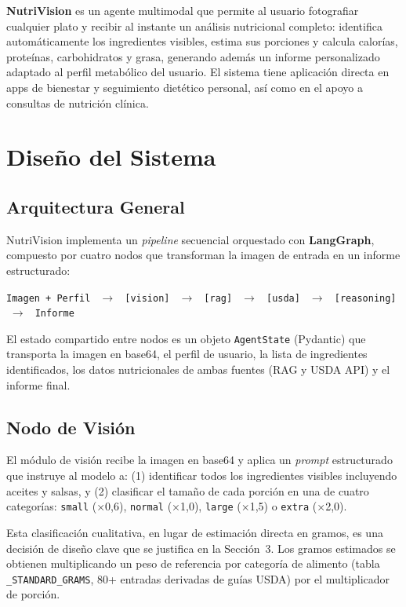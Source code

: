 \documentclass[10pt,a4paper]{article}
\begin{document}
\textbf{NutriVision} es un agente multimodal que permite al usuario fotografiar cualquier plato y
recibir al instante un análisis nutricional completo: identifica automáticamente los ingredientes
visibles, estima sus porciones y calcula calorías, proteínas, carbohidratos y grasa, generando además
un informe personalizado adaptado al perfil metabólico del usuario. El sistema tiene aplicación
directa en apps de bienestar y seguimiento dietético personal, así como en el apoyo a consultas de
nutrición clínica.

\section{Diseño del Sistema}

\subsection{Arquitectura General}

NutriVision implementa un \textit{pipeline} secuencial orquestado con \textbf{LangGraph}, compuesto
por cuatro nodos que transforman la imagen de entrada en un informe estructurado:

\begin{center}
\small
\texttt{Imagen + Perfil $\;\to\;$ [vision] $\;\to\;$ [rag] $\;\to\;$ [usda] $\;\to\;$ [reasoning] $\;\to\;$ Informe}
\end{center}

El estado compartido entre nodos es un objeto \texttt{AgentState} (Pydantic) que transporta la
imagen en base64, el perfil de usuario, la lista de ingredientes identificados, los datos nutricionales
de ambas fuentes (RAG y USDA API) y el informe final.

\subsection{Nodo de Visión}

El módulo de visión recibe la imagen en base64 y aplica un \textit{prompt} estructurado que instruye
al modelo a: (1) identificar todos los ingredientes visibles incluyendo aceites y salsas, y (2)
clasificar el tamaño de cada porción en una de cuatro categorías: \texttt{small} (×0,6),
\texttt{normal} (×1,0), \texttt{large} (×1,5) o \texttt{extra} (×2,0).

Esta clasificación cualitativa, en lugar de estimación directa en gramos, es una decisión de diseño
clave que se justifica en la Sección~3. Los gramos estimados se obtienen multiplicando un peso de
referencia por categoría de alimento (tabla \texttt{\_STANDARD\_GRAMS}, 80+ entradas derivadas de
guías USDA) por el multiplicador de porción.
\end{document}
